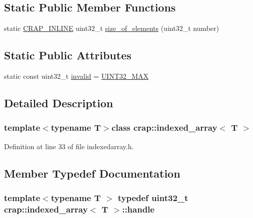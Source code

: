 \subsection*{Static Public Member Functions}
\begin{DoxyCompactItemize}
\item 
static \hyperlink{config__x86_8h_a5a40526b8d842e7ff731509998bb0f1c}{C\+R\+A\+P\+\_\+\+I\+N\+L\+I\+N\+E} uint32\+\_\+t \hyperlink{classcrap_1_1indexed__array_af126de924b0a1ca234676bf95a349a72}{size\+\_\+of\+\_\+elements} (uint32\+\_\+t number)
\end{DoxyCompactItemize}
\subsection*{Static Public Attributes}
\begin{DoxyCompactItemize}
\item 
static const uint32\+\_\+t \hyperlink{classcrap_1_1indexed__array_a547a4e2b6bf39bfc62f7e5017b93136e}{invalid} = \hyperlink{crap__types_8h_ab5eb23180f7cc12b7d6c04a8ec067fdd}{U\+I\+N\+T32\+\_\+\+M\+A\+X}
\end{DoxyCompactItemize}


\subsection{Detailed Description}
\subsubsection*{template$<$typename T$>$class crap\+::indexed\+\_\+array$<$ T $>$}



Definition at line 33 of file indexedarray.\+h.



\subsection{Member Typedef Documentation}
\hypertarget{classcrap_1_1indexed__array_a2bf08c14ec39108ed7bdd9b570dc55ba}{
\subsubsection[{handle}]{\setlength{\rightskip}{0pt plus 5cm}template$<$typename T $>$ typedef uint32\+\_\+t {\bf crap\+::indexed\+\_\+array}$<$ T $>$\+::{\bf handle}}}\label{classcrap_1_1indexed__array_a2bf08c14ec39108ed7bdd9b570dc55ba}


